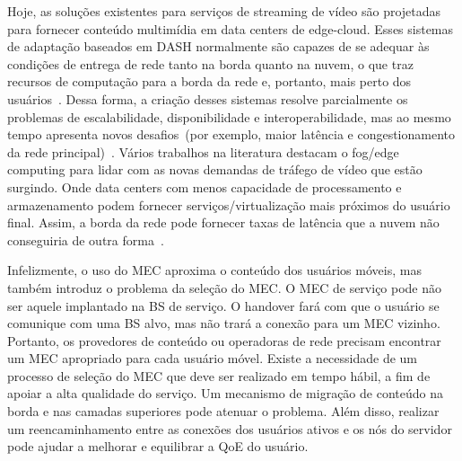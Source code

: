 Hoje, as soluções existentes para serviços de streaming de vídeo são projetadas para fornecer conteúdo multimídia em data centers de edge-cloud. Esses sistemas de adaptação baseados em DASH normalmente são capazes de se adequar às condições de entrega de rede tanto na borda quanto na nuvem, o que traz recursos de computação para a borda da rede e, portanto, mais perto dos usuários~\cite{sitaraman:ACD2014}. Dessa forma, a criação desses sistemas resolve parcialmente os problemas de escalabilidade, disponibilidade e interoperabilidade, mas ao mesmo tempo apresenta novos desafios~(por exemplo, maior latência e congestionamento da rede principal)~\cite{tran:wons17,ye: ITC17, taleb:JSAC18}. Vários trabalhos na literatura destacam o fog/edge computing para lidar com as novas demandas de tráfego de vídeo que estão surgindo. Onde data centers com menos capacidade de processamento e armazenamento podem fornecer serviços/virtualização mais próximos do usuário final. Assim, a borda da rede pode fornecer taxas de latência que a nuvem não conseguiria de outra forma~\cite{gamaUCC2019, rosarioSENSORS2018}.


Infelizmente, o uso do MEC aproxima o conteúdo dos usuários móveis, mas também introduz o problema da seleção do MEC. O MEC de serviço pode não ser aquele implantado na BS de serviço. O handover fará com que o usuário se comunique com uma BS alvo, mas não trará a conexão para um MEC vizinho. Portanto, os provedores de conteúdo ou operadoras de rede precisam encontrar um MEC apropriado para cada usuário móvel. Existe a necessidade de um processo de seleção do MEC que deve ser realizado em tempo hábil, a fim de apoiar a alta qualidade do serviço. Um mecanismo de migração de conteúdo na borda e nas camadas superiores pode atenuar o problema. Além disso, realizar um reencaminhamento entre as conexões dos usuários ativos e os nós do servidor pode ajudar a melhorar e equilibrar a QoE do usuário.



